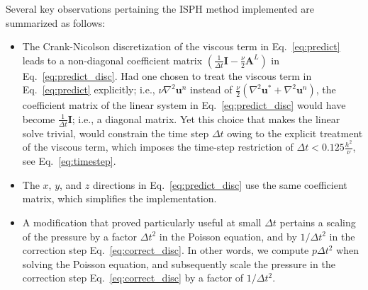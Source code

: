 Several key observations pertaining the ISPH method implemented are summarized as follows:
\begin{itemize}
	\item The Crank-Nicolson discretization of the viscous term in Eq.~\ref{eq:predict} leads to a non-diagonal coefficient matrix $(\frac{1}{\Delta t} \mathbf{I}-\frac{\nu}{2} \mathbf{A}^L)$ in Eq.~\ref{eq:predict_disc}. Had one chosen to treat the viscous term in Eq.~\ref{eq:predict} explicitly; i.e., $\nu \nabla^2\mathbf{u}^n$ instead of $\frac{\nu}{2}(\nabla^2\mathbf{u}^* +\nabla^2\mathbf{u}^n)$, the coefficient matrix of the linear system in Eq.~\ref{eq:predict_disc} would have become $\frac{1}{\Delta t} \mathbf{I}$; i.e., a diagonal matrix. Yet this choice that makes the linear solve trivial, would constrain the time step $\Delta t$ owing to the explicit treatment of the viscous term, which imposes the time-step restriction of $\Delta t < 0.125 \frac{h^2}{\nu}$, see Eq.~\ref{eq:timestep}. 
	
	\item The $x$, $y$, and $z$ directions in Eq.~\ref{eq:predict_disc} use the same coefficient matrix, which simplifies the implementation. 
	
	\item A modification that proved particularly useful at small $\Delta t$ pertains a scaling of the pressure by a factor  $\Delta t^2$ in the Poisson equation, and by $1/\Delta t^2$ in the correction step Eq.~\ref{eq:correct_disc}. In other words, we compute $p\Delta t^2$ when solving the Poisson equation, and subsequently scale the pressure in the correction step Eq.~\ref{eq:correct_disc} by a factor of $1/\Delta t^2$.
\end{itemize} 
